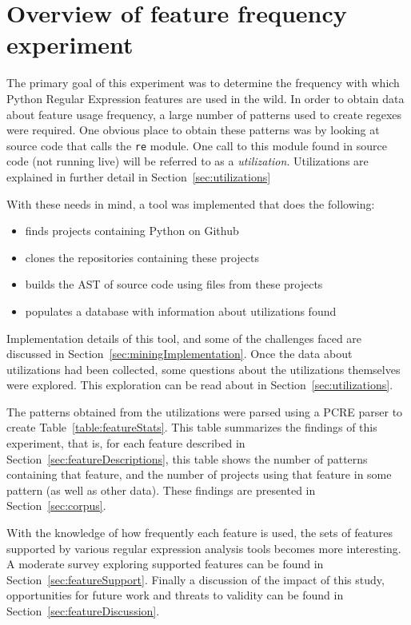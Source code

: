 \section{Overview of feature frequency experiment}

The primary goal of this experiment was to determine the frequency with which Python Regular Expression features are used in the wild.  In order to obtain data about feature usage frequency, a large number of patterns used to create regexes were required.  One obvious place to obtain these patterns was by looking at source code that calls the {\tt re} module.  One call to this module found in source code (not running live) will be referred to as a \emph{utilization}.  Utilizations are explained in further detail in Section~\ref{sec:utilizations}

With these needs in mind, a tool was implemented that does the following:
\begin{itemize} \itemsep -1pt
\item finds projects containing Python on Github
\item clones the repositories containing these projects
\item builds the AST of source code using files from these projects
\item populates a database with information about utilizations found
\end{itemize}

Implementation details of this tool, and some of the challenges faced are discussed in Section~\ref{sec:miningImplementation}.  Once the data about utilizations had been collected, some questions about the utilizations themselves were explored.  This exploration can be read about in Section~\ref{sec:utilizations}.

The patterns obtained from the utilizations were parsed using a PCRE parser to create Table~\ref{table:featureStats}.  This table summarizes the findings of this experiment, that is, for each feature described in Section~\ref{sec:featureDescriptions}, this table shows the number of patterns containing that feature, and the number of projects using that feature in some pattern (as well as other data).  These findings are presented in Section~\ref{sec:corpus}.

With the knowledge of how frequently each feature is used, the sets of features supported by various regular expression analysis tools becomes more interesting.  A moderate survey exploring supported features can be found in Section~\ref{sec:featureSupport}.  Finally a discussion of the impact of this study, opportunities for future work and threats to validity can be found in Section~\ref{sec:featureDiscussion}.
